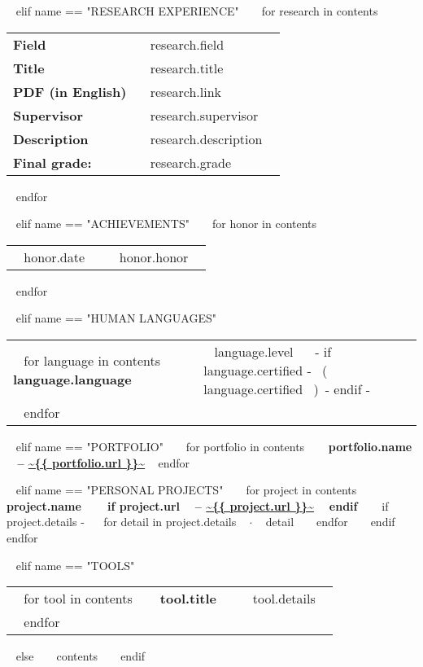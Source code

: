 ~{ elif name == "RESEARCH EXPERIENCE" }~
  ~{ for research in contents }~
    \begin{tabular}{ @{} p{32mm} p{135mm} @{} }

    \small \bf Field & \small ~{{ research.field }}~ \\
    \small \bf Title & \small ~{{ research.title }}~ \\
    \small \bf PDF (in English) & \small ~{{ research.link }}~ \\
    \small \bf Supervisor & \small ~{{ research.supervisor }}~ \\
    \small \bf Description & \small ~{{ research.description }}~ \\
    \small \bf \small \color{maingrey} Final grade: & \small \color{maingrey} ~{{ research.grade }}~ \\
    
    \end{tabular}
    \vspace{1mm}
  ~{ endfor }~
  \vspace{4mm}

~{ elif name == "ACHIEVEMENTS" }~
  ~{ for honor in contents }~
    \begin{tabular}{ @{} p{32mm} p{135mm} @{} }
    {~{{ honor.date }}~} & {\small ~{{ honor.honor }}~}
    \end{tabular}
    \vspace{1mm}
  ~{ endfor }~

~{ elif name == "HUMAN LANGUAGES" }~
  \begin{tabular}{ @{} p{32mm} p{135mm} @{} }
  ~{ for language in contents }~
    \bf {~{{ language.language }}~} & {\small ~{{ language.level }}~ ~{- if language.certified -}~ \small\color{maingrey}\hspace{1mm}(~{{ language.certified }}~)~{- endif -}~} \\
  ~{ endfor }~
  \end{tabular}
  \vspace{50mm}

~{ elif name == "PORTFOLIO" }~
  ~{ for portfolio in contents }~
    {\bf ~{{ portfolio.name }}~ -- \color{maincolor}\url{~{{ portfolio.url }}~} }
    \vspace{1mm}
  ~{ endfor }~
  \vspace{5mm}

~{ elif name == "PERSONAL PROJECTS" }~
  ~{ for project in contents }~
    {\small\bf ~{{ project.name }}~ ~{ if project.url }~ -- \color{maincolor}\url{~{{ project.url }}~} ~{ endif }~ }
    \vspace{1mm}
    ~{ if project.details -}~
    ~{ for detail in project.details }~
      $\cdot$ \small ~{{ detail }}~
    ~{ endfor }~
    ~{ endif }~
    \vspace{3mm}
  ~{ endfor }~
  \vspace{15mm}

~{ elif name == "TOOLS" }~
  \begin{tabular}{ @{} p{32mm} p{135mm} @{} }
  ~{ for tool in contents }~
    \bf\small ~{{ tool.title }}~ & {\small ~{{ tool.details }}~} \\
  ~{ endfor }~
  \end{tabular}
  \vspace{10mm}
~{ else }~
  ~{{ contents }}~
  \bigskip
~{ endif }~


